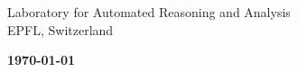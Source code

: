 \begin{titlepage}
  \sf

  \begin{center}
    \vspace*{1cm}

    \textbf{\Huge \ourtitle}

    \vspace{1.5cm}

    {\Large \ournames}

    \vspace{1.5cm}

    {\Large Laboratory for Automated Reasoning and Analysis \\[1ex] EPFL, Switzerland}

  \end{center}

  \vfill

  \begin{center}
    \Large
    \textbf{\large \today}
  \end{center}


\end{titlepage}
